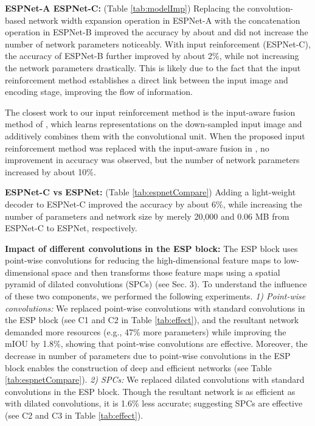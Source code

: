 \documentclass[runningheads]{llncs}
\begin{document}
\noindent \textbf{ESPNet-A  ESPNet-C:} (Table \ref{tab:modelImp}) Replacing the convolution-based network width expansion operation in ESPNet-A with the concatenation operation in ESPNet-B improved the accuracy by about  and did not increase the number of network parameters noticeably. With input reinforcement (ESPNet-C), the accuracy of ESPNet-B further improved by about 2\%, while not increasing the network parameters drastically. This is likely due to the fact that the input reinforcement method establishes a direct link between the input image and encoding stage, improving the flow of information. 

The closest work to our input reinforcement method is the input-aware fusion method of \cite{mehta2017learning}, which learns representations on the down-sampled input image and additively combines them with the convolutional unit. When  the proposed input reinforcement method was replaced with the input-aware fusion in \cite{mehta2017learning}, no improvement in accuracy was observed, but the number of network parameters increased by about 10\%. 

\noindent \textbf{ESPNet-C vs ESPNet:} (Table \ref{tab:espnetCompare}) Adding a light-weight decoder to ESPNet-C improved the accuracy by about 6\%, while increasing the number of parameters and network size by merely 20,000 and 0.06 MB from ESPNet-C to ESPNet, respectively.

\noindent \textbf{Impact of different convolutions in the ESP block:} The ESP block uses point-wise convolutions for reducing the high-dimensional feature maps to low-dimensional space and then transforms those feature maps using a spatial pyramid of dilated convolutions (SPCs) (see Sec. 3). To understand the influence of these two components, we performed the following experiments. 
\textit{1) Point-wise convolutions:} We replaced point-wise convolutions with  standard convolutions in the ESP block (see C1 and C2 in Table \ref{tab:effect}), and the resultant network demanded more resources (e.g., 47\% more parameters) while improving the mIOU by 1.8\%, showing that point-wise convolutions are effective. Moreover, the decrease in number of parameters due to point-wise convolutions in the ESP block enables the construction of deep and efficient networks (see Table \ref{tab:espnetCompare}). 
\textit{2) SPCs:} We replaced  dilated convolutions with  standard convolutions in the ESP block. Though the resultant network is as efficient as with dilated convolutions, it is 1.6\% less accurate; suggesting SPCs are effective (see C2 and C3 in Table \ref{tab:effect}).
\end{document}
